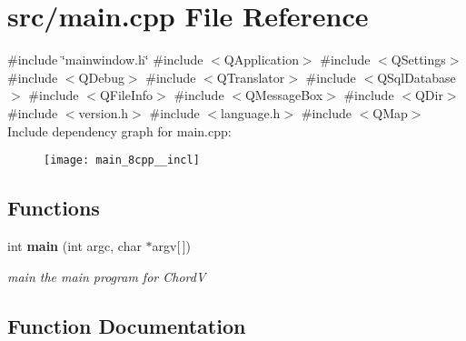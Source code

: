\section{src/main.cpp File Reference}
\label{main_8cpp}
{\ttfamily \#include \char`\"{}mainwindow.\+h\char`\"{}}\newline
{\ttfamily \#include $<$Q\+Application$>$}\newline
{\ttfamily \#include $<$Q\+Settings$>$}\newline
{\ttfamily \#include $<$Q\+Debug$>$}\newline
{\ttfamily \#include $<$Q\+Translator$>$}\newline
{\ttfamily \#include $<$Q\+Sql\+Database$>$}\newline
{\ttfamily \#include $<$Q\+File\+Info$>$}\newline
{\ttfamily \#include $<$Q\+Message\+Box$>$}\newline
{\ttfamily \#include $<$Q\+Dir$>$}\newline
{\ttfamily \#include $<$version.\+h$>$}\newline
{\ttfamily \#include $<$language.\+h$>$}\newline
{\ttfamily \#include $<$Q\+Map$>$}\newline
Include dependency graph for main.\+cpp\+:\nopagebreak
\begin{figure}[H]
\begin{center}
\leavevmode
\texttt{[image: main\_8cpp\_\_incl]}
\end{center}
\end{figure}
\subsection*{Functions}
\begin{DoxyCompactItemize}
\item 
int \textbf{ main} (int argc, char $\ast$argv[$\,$])
\begin{DoxyCompactList}\small\item\em main the main program for ChordV \end{DoxyCompactList}\end{DoxyCompactItemize}


\subsection{Function Documentation}
\mbox{\label{main_8cpp_a0ddf1224851353fc92bfbff6f499fa97}} 
